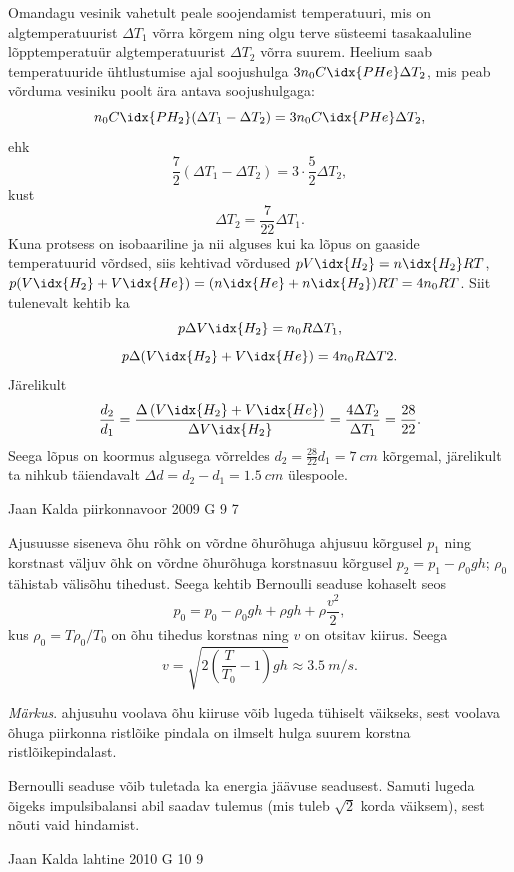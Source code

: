 \documentclass[11pt]{article}
\begin{document}
{{Omandagu vesinik vahetult peale soojendamist temperatuuri, mis on algtemperatuurist $\Delta T_1$ võrra kõrgem ning olgu terve süsteemi tasakaaluline lõpptemperatuür algtemperatuurist $\Delta T_2$ võrra suurem. Heelium saab temperatuuride ühtlustumise ajal soojushulga $3n_0C\idx{PHe}\Delta T_2$, mis peab võrduma vesiniku poolt ära antava soojushulgaga:
\[
n_0C\idx{PH_2} (\Delta T_1 - \Delta T_2) = 3n_0C\idx{PHe}\Delta T_2,
\]
ehk
\[
\frac{7}{2} (\Delta T_1 - \Delta T_2) = 3 \cdot \frac{5}{2} \Delta T_2,
\]
kust
\[
\Delta T_2 = \frac{7}{22} \Delta T_1.
\]
Kuna protsess on isobaariline ja nii alguses kui ka lõpus on gaaside temperatuurid võrdsed, siis kehtivad võrdused $pV\idx{H_2} = n\idx{H_2}RT$, $p(V\idx{H_2} + V\idx{He}) = (n\idx{He} + n\idx{H_2} )RT = 4n_0RT$. Siit tulenevalt kehtib ka
\[
p\Delta V\idx{H_2} = n_0R\Delta T_1,
\]
\[
p\Delta (V\idx{H_2} + V\idx{He}) = 4n_0R\Delta T2.
\]
Järelikult
\[
\frac{d_{2}}{d_{1}}=\frac{\Delta\left(V\idx{H_{2}}+V\idx{H e}\right)}{\Delta V\idx{H_{2}}}=\frac{4 \Delta T_{2}}{\Delta T_{1}}=\frac{28}{22}.
\]
Seega lõpus on koormus algusega võrreldes $d_2 = \frac{28}{22} d_1 = \SI{7}{cm}$ kõrgemal, järelikult ta nihkub täiendavalt $\Delta d = d_2 - d_1 = \SI{1,5}{cm}$ ülespoole. 
\fi
}

{Jaan Kalda} %
{piirkonnavoor} %
{2009} %
{G 9} %
{7} %
{

\ifSolution
Ajusuusse siseneva õhu rõhk on võrdne õhurõhuga ahjusuu kõrgusel $p_1$ ning korstnast väljuv õhk on võrdne õhurõhuga korstnasuu kõrgusel $p_2=p_1-\rho_0 gh$;
$\rho_0$ tähistab välisõhu tihedust. Seega kehtib Bernoulli seaduse kohaselt seos 
\[
p_0=p_0-\rho_0 gh +\rho gh+\rho \frac{v^2}{2},
\]
kus $\rho_0=T\rho_0/T_0$ on õhu tihedus korstnas ning $v$ on otsitav kiirus. Seega
\[
v=\sqrt {2(\frac T{T_0}-1)gh}\approx \SI{3,5}{m/s}.
\]

\emph{Märkus}. ahjusuhu voolava õhu kiiruse võib lugeda tühiselt väikseks, sest voolava õhuga piirkonna ristlõike pindala on ilmselt hulga suurem korstna ristlõikepindalast.


Bernoulli seaduse võib tuletada ka energia jäävuse seadusest. Samuti lugeda õigeks impulsibalansi abil saadav tulemus (mis tuleb $\sqrt 2$ korda väiksem), sest nõuti vaid hindamist.
\fi
}

{Jaan Kalda} %
{lahtine} %
{2010} %
{G 10} %
{9} %
{

}}
\end{document}
